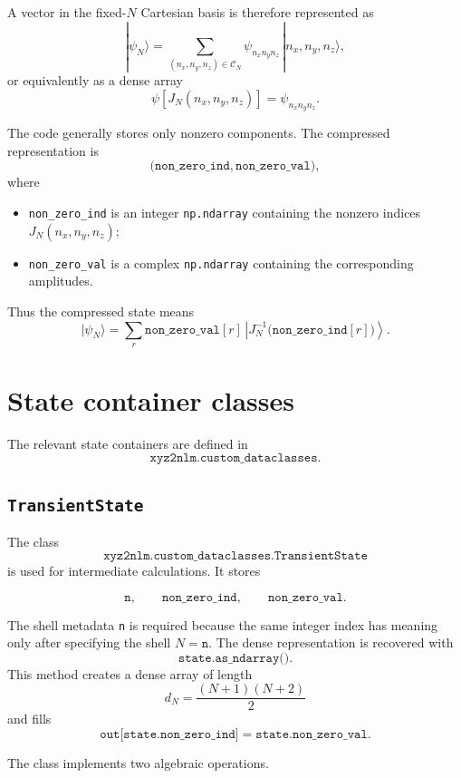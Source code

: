 \documentclass[11pt]{article}
\begin{document}
A vector in the fixed-\(N\) Cartesian basis is therefore represented as
\[
    |\psi_N\rangle
    =
    \sum_{(n_x,n_y,n_z)\in\mathcal C_N}
    \psi_{n_xn_yn_z}\,
    |n_x,n_y,n_z\rangle ,
\]
or equivalently as a dense array
\[
    \psi[J_N(n_x,n_y,n_z)]
    =
    \psi_{n_xn_yn_z}.
\]

The code generally stores only nonzero components. The compressed
representation is
\[
    \bigl(\texttt{non\_zero\_ind},\texttt{non\_zero\_val}\bigr),
\]
where

\begin{itemize}
    \item \texttt{non\_zero\_ind} is an integer \texttt{np.ndarray} containing
    the nonzero indices \(J_N(n_x,n_y,n_z)\);
    \item \texttt{non\_zero\_val} is a complex \texttt{np.ndarray} containing
    the corresponding amplitudes.
\end{itemize}

Thus the compressed state means
\[
    |\psi_N\rangle
    =
    \sum_{r}
    \texttt{non\_zero\_val}[r]\,
    \left|
        J_N^{-1}\bigl(\texttt{non\_zero\_ind}[r]\bigr)
    \right\rangle .
\]

\section{State container classes}

The relevant state containers are defined in
\[
    \texttt{xyz2nlm.custom\_dataclasses}.
\]

\subsection{\texttt{TransientState}}

The class
\[
    \texttt{xyz2nlm.custom\_dataclasses.TransientState}
\]
is used for intermediate calculations. It stores

\[
    \texttt{n},\qquad
    \texttt{non\_zero\_ind},\qquad
    \texttt{non\_zero\_val}.
\]

The shell metadata \texttt{n} is required because the same integer index has
meaning only after specifying the shell \(N=\texttt{n}\). The dense
representation is recovered with
\[
    \texttt{state.as\_ndarray()}.
\]
This method creates a dense array of length
\[
    d_N=\frac{(N+1)(N+2)}{2}
\]
and fills
\[
    \texttt{out[state.non\_zero\_ind]}=
    \texttt{state.non\_zero\_val}.
\]

The class implements two algebraic operations.
\end{document}
